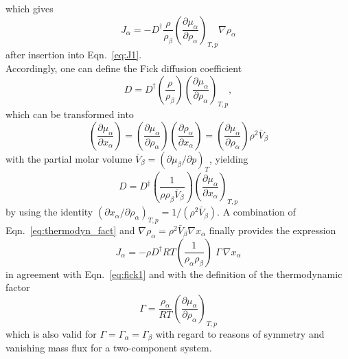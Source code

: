 \documentclass[aip,jcp,reprint]{revtex4-1}
\begin{document}
which gives 
\begin{equation}
\label{eq:j1_pre}
{J}_{\alpha}=-D^{\dag}\frac{\rho}{\rho_{\beta}}\left(\frac{\partial \mu_{\alpha}}{\partial \rho_{\alpha}}\right)_{T,p}  { \nabla}\rho_{\alpha}
\end{equation}
after insertion into Eqn.~\eqref{eq:J1}.\\
Accordingly, one can define the Fick diffusion coefficient
\begin{equation}
\label{eq:finaldiff1}
D= D^{\dag}\left(\frac{\rho}{\rho_{\beta}}\right)\left(\frac{\partial \mu_{\alpha}}{\partial \rho_{\alpha}}\right)_{T,p},
\end{equation}
which can be transformed into  \cite{ben13a}
\begin{equation}
\left(\frac{\partial \mu_{\alpha}}{\partial x_{\alpha}}\right)=\left(\frac{\partial \mu_{\alpha}}{\partial \rho_{\alpha}}\right)\left(\frac{\partial \rho_{\alpha}}{\partial x_{\alpha}}\right) = \left(\frac{\partial \mu_{\alpha}}{\partial \rho_{\alpha}}\right)\rho^2\bar{V}_{\beta}
\end{equation}
with the partial molar volume $\bar{V}_{\beta}=(\partial \mu_{\beta}/\partial p)_{T}$,
yielding
\begin{equation}
\label{eq:prems1}
D=D^{\dag}\left(\frac{1}{\rho \rho_{\beta}\bar{V}_{\beta}}\right)\left(\frac{\partial \mu_{\alpha}}{\partial x_{\alpha}}\right)_{T,p}
\end{equation}
by using the identity\cite{ben13a}
$(\partial x_{\alpha}/\partial \rho_{\alpha})_{T,p}=1/(\rho^2\bar{V}_{\beta})$.
A combination of  Eqn.~\eqref{eq:thermodyn_fact}  and $\nabla \rho_{\alpha} = \rho^2 \bar{V}_{\beta} \nabla x_{\alpha}$ finally provides the expression
\begin{equation}
\label{eq:prems2}
J_{\alpha}= - \rho D^{\dag}RT\left(\frac{1}{\rho_{\alpha}\rho_{\beta}}\right)\;\Gamma\,{\nabla}x_{\alpha}
\end{equation}
in agreement with Eqn.~\eqref{eq:fick1} and with the definition of the thermodynamic factor \cite{guevara16a,janzen17a,lecce17a}
\begin{equation}
 \label{eq:thermodyn_fact}
    \Gamma=\frac{\rho_{\alpha}}{RT}\left(\frac{\partial \mu_{\alpha}}{\partial \rho_{\alpha}}\right)_{T,p}
\end{equation}
which is also valid for $\Gamma=\Gamma_{\alpha}=\Gamma_{\beta}$ with regard to reasons of symmetry and vanishing mass flux for a two-component system.
\end{document}
